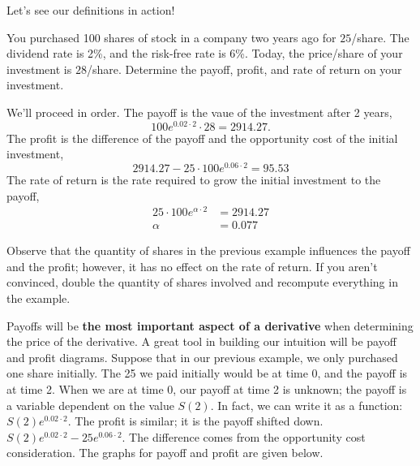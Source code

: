 \documentclass{ximera}
\begin{document}
Let's see our definitions in action!

\begin{example}
You purchased 100 shares of stock in a company two years ago for $25$/share. The dividend rate is 2\%, and the risk-free rate is 6\%. Today, the price/share of your investment is $28$/share. Determine the payoff, profit, and rate of return on your investment.

\end{example}

\begin{solution}
We'll proceed in order. The payoff is the vaue of the investment after 2 years,
	\begin{equation*}
		100e^{0.02\cdot 2}\cdot 28=2914.27.
	\end{equation*}
The profit is the difference of the payoff and the opportunity cost of the initial investment,
	\begin{equation*}
		2914.27-25\cdot 100e^{0.06\cdot 2}=95.53
	\end{equation*}
The rate of return is the rate required to grow the initial investment to the payoff,
	\begin{align*}
		25\cdot 100e^{\alpha\cdot 2}&=2914.27\\
		\alpha&=0.077
	\end{align*}
\end{solution}


\begin{remark}
Observe that the quantity of shares in the previous example influences the payoff and the profit; however, it has no effect on the rate of return. If you aren't convinced, double the quantity of shares involved and recompute everything in the example.
\end{remark}

Payoffs will be {\bf the most important aspect of a derivative} when determining the price of the derivative. A great tool in building our intuition will be payoff and profit diagrams. Suppose that in our previous example, we only purchased one share initially. The 25 we paid initially would be at time 0, and the payoff is at time 2. When we are at time 0, our payoff at time 2 is unknown; the payoff is a variable dependent on the value $S(2)$. In fact, we can write it as a function: $S(2)e^{0.02\cdot 2}$. The profit is similar; it is the payoff shifted down. $S(2)e^{0.02\cdot 2}-25e^{0.06\cdot 2}$. The difference comes from the opportunity cost consideration. The graphs for payoff and profit are given below.
\end{document}
